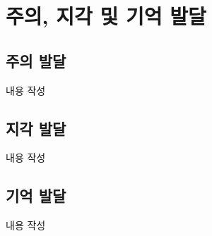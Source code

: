 \section{주의, 지각 및 기억 발달}

\subsection{주의 발달}
내용 작성

\subsection{지각 발달}
내용 작성

\subsection{기억 발달}
내용 작성
